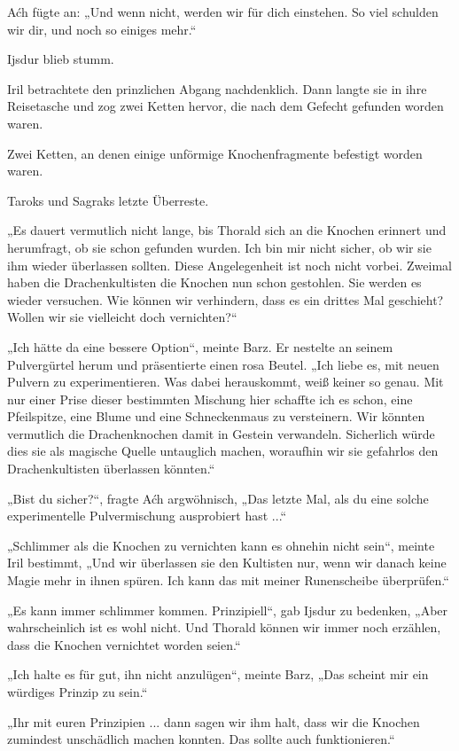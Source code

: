 Aćh fügte an: „Und wenn nicht, werden wir für dich einstehen. So viel schulden wir dir, und noch so einiges mehr.“

Ijsdur blieb stumm.

Iril betrachtete den prinzlichen Abgang nachdenklich. Dann langte sie in ihre Reisetasche und zog zwei Ketten hervor, die nach dem Gefecht gefunden worden waren.

Zwei Ketten, an denen einige unförmige Knochenfragmente befestigt worden waren.

Taroks und Sagraks letzte Überreste.

„Es dauert vermutlich nicht lange, bis Thorald sich an die Knochen erinnert und herumfragt, ob sie schon gefunden wurden. Ich bin mir nicht sicher, ob wir sie ihm wieder überlassen sollten. Diese Angelegenheit ist noch nicht vorbei. Zweimal haben die Drachenkultisten die Knochen nun schon gestohlen. Sie werden es wieder versuchen. Wie können wir verhindern, dass es ein drittes Mal geschieht? Wollen wir sie vielleicht doch vernichten?“

„Ich hätte da eine bessere Option“, meinte Barz. Er nestelte an seinem Pulvergürtel herum und präsentierte einen rosa Beutel. „Ich liebe es, mit neuen Pulvern zu experimentieren. Was dabei herauskommt, weiß keiner so genau. Mit nur einer Prise dieser bestimmten Mischung hier schaffte ich es schon, eine Pfeilspitze, eine Blume und eine Schneckenmaus zu versteinern. Wir könnten vermutlich die Drachenknochen damit in Gestein verwandeln. Sicherlich würde dies sie als magische Quelle untauglich machen, woraufhin wir sie gefahrlos den Drachenkultisten überlassen könnten.“

„Bist du sicher?“, fragte Aćh argwöhnisch, „Das letzte Mal, als du eine solche experimentelle Pulvermischung ausprobiert hast ...“

„Schlimmer als die Knochen zu vernichten kann es ohnehin nicht sein“, meinte Iril bestimmt, „Und wir überlassen sie den Kultisten nur, wenn wir danach keine Magie mehr in ihnen spüren. Ich kann das mit meiner Runenscheibe überprüfen.“

„Es kann immer schlimmer kommen. Prinzipiell“, gab Ijsdur zu bedenken, „Aber wahrscheinlich ist es wohl nicht. Und Thorald können wir immer noch erzählen, dass die Knochen vernichtet worden seien.“

„Ich halte es für gut, ihn nicht anzulügen“, meinte Barz, „Das scheint mir ein würdiges Prinzip zu sein.“

„Ihr mit euren Prinzipien ... dann sagen wir ihm halt, dass wir die Knochen zumindest unschädlich machen konnten. Das sollte auch funktionieren.“


